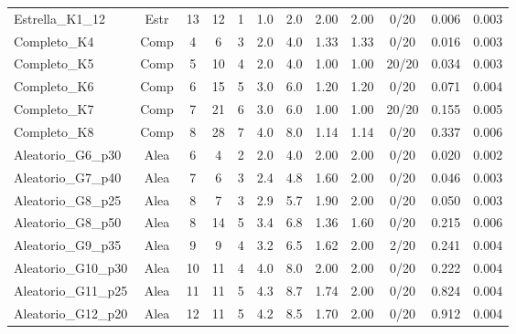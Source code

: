 \begin{table}[H]
\begin{tabular*}{\textwidth}{@{\extracolsep{\fill}}lccccccccccc}
Estrella\_K1\_12 & Estr & 13 & 12 & 1 & 1.0 & 2.0 & 2.00 & 2.00 & 0/20 & 0.006 & 0.003 \\
Completo\_K4 & Comp & 4 & 6 & 3 & 2.0 & 4.0 & 1.33 & 1.33 & 0/20 & 0.016 & 0.003 \\
Completo\_K5 & Comp & 5 & 10 & 4 & 2.0 & 4.0 & 1.00 & 1.00 & 20/20 & 0.034 & 0.003 \\
Completo\_K6 & Comp & 6 & 15 & 5 & 3.0 & 6.0 & 1.20 & 1.20 & 0/20 & 0.071 & 0.004 \\
Completo\_K7 & Comp & 7 & 21 & 6 & 3.0 & 6.0 & 1.00 & 1.00 & 20/20 & 0.155 & 0.005 \\
Completo\_K8 & Comp & 8 & 28 & 7 & 4.0 & 8.0 & 1.14 & 1.14 & 0/20 & 0.337 & 0.006 \\
Aleatorio\_G6\_p30 & Alea & 6 & 4 & 2 & 2.0 & 4.0 & 2.00 & 2.00 & 0/20 & 0.020 & 0.002 \\
Aleatorio\_G7\_p40 & Alea & 7 & 6 & 3 & 2.4 & 4.8 & 1.60 & 2.00 & 0/20 & 0.046 & 0.003 \\
Aleatorio\_G8\_p25 & Alea & 8 & 7 & 3 & 2.9 & 5.7 & 1.90 & 2.00 & 0/20 & 0.050 & 0.003 \\
Aleatorio\_G8\_p50 & Alea & 8 & 14 & 5 & 3.4 & 6.8 & 1.36 & 1.60 & 0/20 & 0.215 & 0.006 \\
Aleatorio\_G9\_p35 & Alea & 9 & 9 & 4 & 3.2 & 6.5 & 1.62 & 2.00 & 2/20 & 0.241 & 0.004 \\
Aleatorio\_G10\_p30 & Alea & 10 & 11 & 4 & 4.0 & 8.0 & 2.00 & 2.00 & 0/20 & 0.222 & 0.004 \\
Aleatorio\_G11\_p25 & Alea & 11 & 11 & 5 & 4.3 & 8.7 & 1.74 & 2.00 & 0/20 & 0.824 & 0.004 \\
Aleatorio\_G12\_p20 & Alea & 12 & 11 & 5 & 4.2 & 8.5 & 1.70 & 2.00 & 0/20 & 0.912 & 0.004 \\
        \bottomrule
    \end{tabular*}
\end{table}

